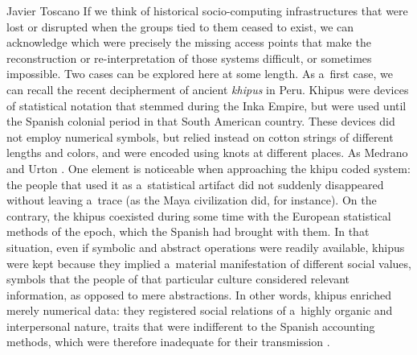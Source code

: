\begin{artengenv}{Javier Toscano}
If we think of historical socio-computing infrastructures that were lost or disrupted when the groups tied to them ceased to exist, we can acknowledge which were precisely the missing access points that make the reconstruction or re-interpretation of those systems difficult, or sometimes impossible. Two cases can be explored here at some length. As a~first case, we can recall the recent decipherment of ancient \textit{khipus} in Peru. Khipus were devices of statistical notation that stemmed during the Inka Empire, but were used until the Spanish colonial period in that South American country. These devices did not employ numerical symbols, but relied instead on cotton strings of different lengths and colors, and were encoded using knots at different places. As Medrano and Urton \parencite*[][p.2]{medrano_toward_2018}. %
 One element is noticeable when approaching the khipu coded system: the people that used it as a~statistical artifact did not suddenly disappeared without leaving a~trace (as the Maya civilization did, for instance). On the contrary, the khipus coexisted during some time with the European statistical methods of the epoch, which the Spanish had brought with them. In that situation, even if symbolic and abstract operations were readily available, khipus were kept because they implied a~material manifestation of different social values, symbols that the people of that particular culture considered relevant information, as opposed to mere abstractions. In other words, khipus enriched merely numerical data: they registered social relations of a~highly organic and interpersonal nature, traits that were indifferent to the Spanish accounting methods, which were therefore inadequate for their transmission 
\parencite[][p.12]{medrano_toward_2018}.%



\end{artengenv}
